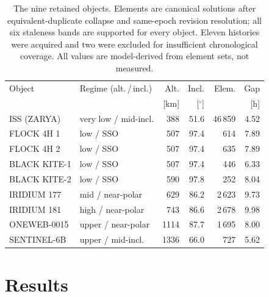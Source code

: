 \documentclass[conference]{IEEEtran}
\begin{document}
\begin{table}[t]
\centering
\footnotesize
\caption{The nine retained objects. Elements are canonical solutions after
equivalent-duplicate collapse and same-epoch revision resolution; all six
staleness bands are supported for every object. Eleven histories were acquired
and two were excluded for insufficient chronological coverage. All values are
model-derived from element sets, not measured.}
\label{tab:data}
\setlength{\tabcolsep}{3.2pt}
\begin{tabular}{llrrrr}
\toprule
Object & Regime (alt.\,/\,incl.) & Alt. & Incl. & Elem. & Gap \\
 & & [km] & [$^\circ$] & & [h] \\
\midrule
ISS (ZARYA)   & very low / mid-incl. & 388  & 51.6 & 46\,859 & 4.52 \\
FLOCK 4H 1    & low / SSO            & 507  & 97.4 & 614     & 7.89 \\
FLOCK 4H 2    & low / SSO            & 507  & 97.4 & 635     & 7.89 \\
BLACK KITE-1  & low / SSO            & 507  & 97.4 & 446     & 6.33 \\
BLACK KITE-2  & low / SSO            & 590  & 97.8 & 252     & 8.04 \\
IRIDIUM 177   & mid / near-polar     & 629  & 86.2 & 2\,623  & 9.73 \\
IRIDIUM 181   & high / near-polar    & 743  & 86.6 & 2\,678  & 9.98 \\
ONEWEB-0015   & upper / near-polar   & 1114 & 87.7 & 1\,695  & 8.00 \\
SENTINEL-6B   & upper / mid-incl.    & 1336 & 66.0 & 727     & 5.62 \\
\bottomrule
\end{tabular}
\end{table}

\section{Results}
\label{sec:results}
\end{document}
